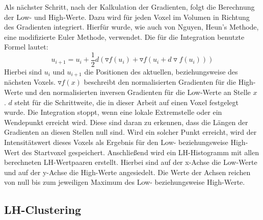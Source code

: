 Als nächster Schritt, nach der Kalkulation der Gradienten, folgt die Berechnung der Low- und High-Werte. Dazu wird für jeden Voxel im Volumen in Richtung des Gradienten integriert.
\newline
Hierfür wurde, wie auch von Nguyen, Heun's Methode, eine modifizierte Euler Methode, verwendet. Die für die Integration benutzte Formel lautet:
\begin{equation}
	u_{i+1} = u_{i} + \frac{1}{2}d(\triangledown f (u_{i}) + \triangledown f(u_{i}+d \triangledown f(u_{i}))) 
\end{equation}
Hierbei sind $u_{i}$ und $u_{i+1}$ die Positionen des aktuellen, beziehungsweise des nächsten Voxels. $\triangledown f(x)$ beschreibt den normalisierten Gradienten für die High-Werte und den normalisierten inversen Gradienten für die Low-Werte an Stelle $x$ . $d$ steht für die Schrittweite, die in dieser Arbeit auf einen Voxel festgelegt wurde.
\newline
Die Integration stoppt, wenn eine lokale Extremstelle oder ein Wendepunkt erreicht wird. Diese sind daran zu erkennen, dass die Längen der Gradienten an diesen Stellen null sind.
\newline
Wird ein solcher Punkt erreicht, wird der Intensitätswert dieses Voxels als Ergebnis für den Low- beziehungsweise High-Wert des Startvoxel gespeichert.
\newline
Anschließend wird ein LH-Histogramm mit allen berechneten LH-Wertpaaren erstellt. Hierbei sind auf der x-Achse die Low-Werte und auf der y-Achse die High-Werte angesiedelt. Die Werte der Achsen reichen von null bis zum jeweiligen Maximum des Low- beziehungsweise High-Werte.

\subsection{LH-Clustering}

